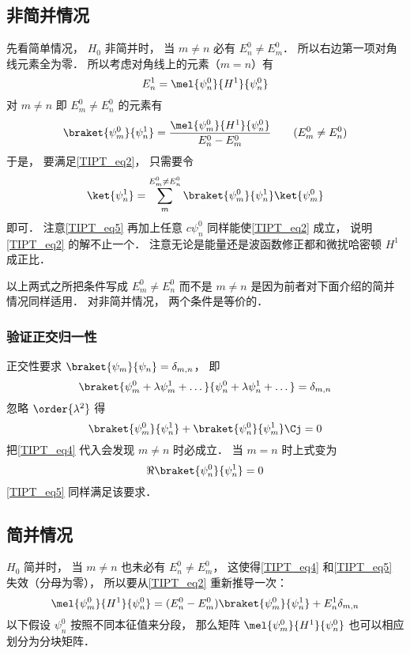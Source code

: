 \subsection{非简并情况}
先看简单情况， $H_0$ 非简并时， 当 $m\ne n$ 必有 $E_n^0 \ne E_m^0$． 所以右边第一项对角线元素全为零． 所以考虑对角线上的元素（$m = n$）有
\begin{equation}\label{TIPT_eq6}
E_n^1 = \mel{\psi_n^0}{H^1}{\psi_n^0}
\end{equation}
对 $m \ne n$ 即 $E_m^0 \ne E_n^0$ 的元素有
\begin{equation}\label{TIPT_eq4}
\braket{\psi_m^0}{\psi_n^1} = \frac{\mel{\psi_m^0}{H^1}{\psi_n^0}}{E_n^0 - E_m^0} \qquad (E_m^0 \ne E_n^0)
\end{equation}
于是， 要满足\autoref{TIPT_eq2}， 只需要令
\begin{equation}\label{TIPT_eq5}
\ket{\psi_n^1} = \sum_m^{E_m^0 \ne E_n^0} \braket{\psi_m^0}{\psi_n^1} \ket{\psi_m^0}
\end{equation}
即可． 注意\autoref{TIPT_eq5} 再加上任意 $c \psi_n^0$ 同样能使\autoref{TIPT_eq2} 成立， 说明\autoref{TIPT_eq2} 的解不止一个． 注意无论是能量还是波函数修正都和微扰哈密顿 $H^1$ 成正比．

以上两式之所把条件写成 $E_m^0 \ne E_n^0$ 而不是 $m \ne n$ 是因为前者对下面介绍的简并情况同样适用． 对非简并情况， 两个条件是等价的．

\subsubsection{验证正交归一性}
正交性要求 $\braket{\psi_m}{\psi_n} = \delta_{m,n}$， 即
\begin{equation}\label{TIPT_eq7}
\braket{\psi_m^0 + \lambda \psi_m^1 + \dots}{\psi_n^0 + \lambda \psi_n^1 + \dots} = \delta_{m,n}
\end{equation}
忽略 $\order{\lambda^2}$ 得
\begin{equation}\label{TIPT_eq8}
\braket{\psi_m^0}{\psi_n^1} + \braket{\psi_n^0}{\psi_m^1}\Cj = 0
\end{equation}
把\autoref{TIPT_eq4} 代入会发现 $m \ne n$ 时必成立． 当 $m = n$ 时上式变为
\begin{equation}
\Re{\braket{\psi_n^0}{\psi_n^1}} = 0
\end{equation}
\autoref{TIPT_eq5} 同样满足该要求．

\subsection{简并情况}
$H_0$ 简并时， 当 $m\ne n$ 也未必有 $E_n^0 \ne E_m^0$， 这使得\autoref{TIPT_eq4} 和\autoref{TIPT_eq5} 失效（分母为零）， 所以要从\autoref{TIPT_eq2} 重新推导一次：
\begin{equation}
\mel{\psi_m^0}{H^1}{\psi_n^0} = (E_n^0 - E_m^0) \braket{\psi_m^0}{\psi_n^1} + E_n^1 \delta_{m,n}
\end{equation}
以下假设 $\psi_n^0$ 按照不同本征值来分段， 那么矩阵 $\mel{\psi_m^0}{H^1}{\psi_n^0}$ 也可以相应划分为分块矩阵．


